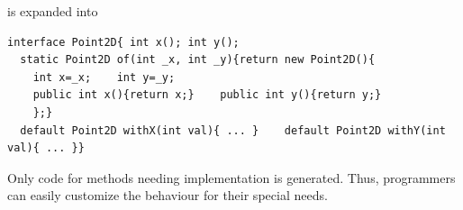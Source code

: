 \noindent is expanded into
\begin{lstlisting}
interface Point2D{ int x(); int y();
  static Point2D of(int _x, int _y){return new Point2D(){
    int x=_x;    int y=_y;
    public int x(){return x;}    public int y(){return y;}
    };}
  default Point2D withX(int val){ ... }    default Point2D withY(int val){ ... }}
\end{lstlisting}

\noindent Only code for methods needing implementation is generated. Thus,
programmers can easily customize the behaviour for their special needs.





%

